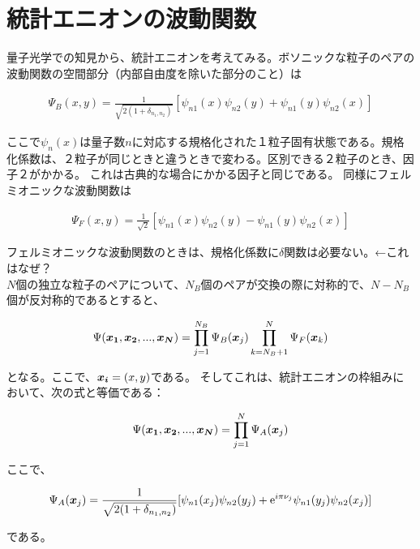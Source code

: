 \documentclass[a4paper,11pt]{jsarticle}
\numberwithin{equation}{section}
\begin{document}
\section{統計エニオンの波動関数}
量子光学での知見から、統計エニオンを考えてみる。ボソニックな粒子のペアの波動関数の空間部分（内部自由度を除いた部分のこと）は

\begin{align}
\Psi_B(x,y) = \frac{1}{\sqrt{2(1+\delta_{n_1,n_2})}}[\psi_{n1}(x)\psi_{n2}(y)+\psi_{n1}(y)\psi_{n2}(x)]
\end{align}

ここで$\psi_n(x)$は量子数$n$に対応する規格化された１粒子固有状態である。規格化係数は、２粒子が同じときと違うときで変わる。区別できる２粒子のとき、因子２がかかる。
これは古典的な場合にかかる因子と同じである。
同様にフェルミオニックな波動関数は

\begin{align}
  \Psi_F(x,y) = \frac{1}{\sqrt{2}}[\psi_{n1}(x)\psi_{n2}(y)-\psi_{n1}(y)\psi_{n2}(x)]
\end{align}

フェルミオニックな波動関数のときは、規格化係数に$\delta$関数は必要ない。←これはなぜ？\\
$N$個の独立な粒子のペアについて、$N_B$個のペアが交換の際に対称的で、$N-N_B$個が反対称的であるとすると、

\begin{align}
\Psi(\vb*{x_1},\vb*{x_2},...,\vb*{x_N})=\prod_{j=1}^{N_B}\Psi_B(\vb*{x}_j)\prod_{k=N_B+1}^{N}\Psi_F(\vb*{x}_k)
\end{align}

となる。ここで、$\vb*{x_i}=(x,y)$である。
そしてこれは、統計エニオンの枠組みにおいて、次の式と等価である：

\begin{align}
  \Psi(\vb*{x_1},\vb*{x_2},...,\vb*{x_N})=\prod_{j=1}^{N}\Psi_A(\vb*{x}_j)
\end{align}

ここで、

\begin{align}
\Psi_A(\vb*{x}_j)&=\frac{1}{\sqrt{2(1+\delta_{n_1,n_2})}}[\psi_{n1}(x_j)\psi_{n2}(y_j)+\mathrm{e}^{i\pi\nu_j}\psi_{n1}(y_j)\psi_{n2}(x_j)]\\
\end{align}

である。
\end{document}
